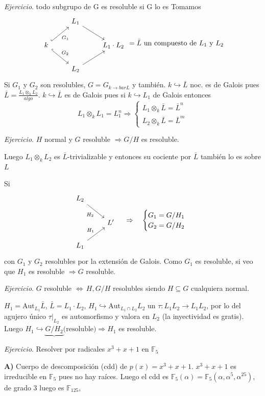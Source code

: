 \noindent \textit{Ejercicio}. todo subgrupo de G es resoluble si G lo es
Tomamos 
$$\bt & L_1 \arrow{rd} & \\ k \arrow[hook, swap]{ur}{G_1} \arrow[hook]{dr}{G_2}  & & L_1 \cdot L_2 \\ & L_2 \arrow{ru} &  \et = \bar{L} \text{ un compuesto de } L_1 \text{ y } L_2$$
Si $G_1$ y $G_2$ son resolubles, $G = G_{k \to bar{L}}$ y tambi\'en. $k \hookrightarrow \bar{L}$ noc. es de Galois pues $\bar{L} = \frac{L_1 \otimes_k L_2}{algo}$. $k \hookrightarrow \bar{L}$ es de Galois pues si $k \hookrightarrow L_1$ de Galois entonces $$L_1 \otimes_k L_1 = L_1^n \Rightarrow \begin{cases} L_1 \otimes_k \bar{L} = \bar{L}^n \\ L_2 \otimes_k \bar{L} = \bar{L}^m \end{cases}$$

\noindent \textit{Ejercicio}. $H$ normal y $G$ resoluble $\Rightarrow G/H$ es resoluble.

\noindent Luego $L_1 \otimes_k L_2$ es $\bar{L}$-trivializable y entonces su cociente por $\bar{L}$ tambi\'en lo es sobre $L$ 

\noindent Si 
$$\bt L_2 \arrow[swap]{dr}{H_2} & \\ & L' \\ L_1 \arrow{ur}{H_1} & \et \quad \Rightarrow \quad \begin{cases}
G_1=G/H_1 \\ G_2= G/H_2 \end{cases}$$ con $G_1$ y $G_2$ resolubles por la extensi\'on de Galois. Como $G_1$ es resoluble, si veo que $H_1$ es resoluble $\Rightarrow G$ resoluble.

\noindent \textit{Ejercicio}. $G$ resoluble $\iff \, H, G/H$ resolubles siendo $H \subseteq G$ cualquiera normal.

$H_1 = \text{Aut}_{L_1} \bar{L}$, $\bar{L} = L_1 \cdot L_2$, $H_1 \hookrightarrow \text{Aut}_{L_1 \cap L_2} L_2$ un $\tau : L_1 L_2 \to L_1 L_2$, por lo del agujero único $\tau|_{L_2}$ es automorfismo y valora en $L_2$ (la inyectividad es gratis). Luego $H_1 \hookrightarrow \underbrace{G/H_2} \text{(resoluble)}\Rightarrow H_1$ es resoluble.

\noindent \textit{Ejercicio}. Resolver por radicales $x^3+x+1$ en $\mathbb{F}_5$ 

\textbf{A)} Cuerpo de descomposici\'on (cdd) de $p(x) = x^3+x+1$. $x^3+x+1$ es irreducible en $\mathbb{F}_5$ pues no hay raíces. Luego el cdd es $\mathbb{F}_5(\alpha) = \mathbb{F}_5(\alpha, \alpha^5, \alpha^{25})$, de grado 3 luego es $\mathbb{F}_{125}$, 

